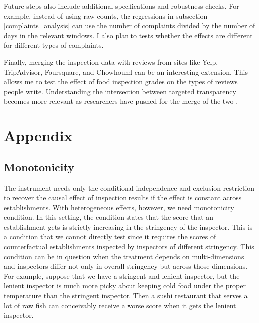 \documentclass[11pt]{article}
\begin{document}
Future steps also include additional specifications and robustness checks. For example, instead of using raw counts, the regressions in subsection \ref{complaints_analysis} can use the number of complaints divided by the number of days in the relevant windows. I also plan to tests whether the effects are different for different types of complaints. 

Finally, merging the inspection data with reviews from sites like Yelp, TripAdvisor, Foursquare, and Chowhound can be an interesting extension. This allows me to test the effect of food inspection grades on the types of reviews people write. Understanding the intersection between targeted transparency becomes more relevant as researchers have pushed for the merge of the two \citep{Luca_13}.

\newpage





\newpage

\section{Appendix}

\subsection{Monotonicity}

The instrument needs only the conditional independence and exclusion restriction to recover the causal effect of inspection results if the effect is constant across establishments. With heterogeneous effects, however, we need monotonicity condition. In this setting, the condition states that the score that an establishment gets is strictly increasing in the stringency of the inspector. This is a condition that we cannot directly test since it requires the scores of counterfactual establishments inspected by inspectors of different stringency. This condition can be in question when the treatment depends on multi-dimensions and inspectors differ not only in overall stringency but across those dimensions. For example, suppose that we have a stringent and lenient inspector, but the lenient inspector is much more picky about keeping cold food under the proper temperature than the stringent inspector. Then a sushi restaurant that serves a lot of raw fish can conceivably receive a worse score when it gets the lenient inspector. 
\end{document}
